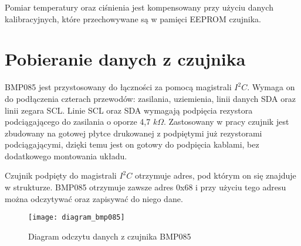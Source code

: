 Pomiar temperatury oraz ciśnienia jest kompensowany przy użyciu danych kalibracyjnych, które przechowywane są w pamięci EEPROM czujnika.

\section*{Pobieranie danych z czujnika}
BMP085 jest przystosowany do łączności za pomocą magistrali $I^2C$. Wymaga on do podłączenia czterach przewodów: zasilania, uziemienia, linii danych SDA oraz linii zegara SCL. Linie SCL oraz SDA wymagają podpięcia rezystora podciągającego do zasilania o oporze 4,7 $ k\Omega$. Zastosowany w pracy czujnik jest zbudowany na gotowej płytce drukowanej z podpiętymi już rezystorami podciągającymi, dzięki temu jest on gotowy do podpięcia kablami, bez dodatkowego montowania układu.

Czujnik podpięty do magistrali $I^2C$ otrzymuje adres, pod którym on się znajduje w strukturze. BMP085 otrzymuje zawsze adres 0x68 i przy użyciu tego adresu można odczytywać oraz zapisywać do niego dane.

\begin{figure}[h]
\centering
\texttt{[image: diagram\_bmp085]}
\caption{Diagram odczytu danych z czujnika BMP085}
\label{fig:diagram_bmp085}
\end{figure}